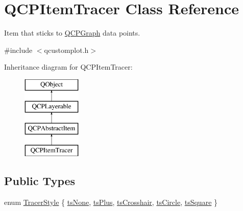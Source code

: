 \hypertarget{class_q_c_p_item_tracer}{}\section{Q\+C\+P\+Item\+Tracer Class Reference}
\label{class_q_c_p_item_tracer}


Item that sticks to \mbox{\hyperlink{class_q_c_p_graph}{Q\+C\+P\+Graph}} data points.  




{\ttfamily \#include $<$qcustomplot.\+h$>$}

Inheritance diagram for Q\+C\+P\+Item\+Tracer\+:\begin{figure}[H]
\begin{center}
\leavevmode
\includegraphics[height=4.000000cm]{d9/da3/class_q_c_p_item_tracer}
\end{center}
\end{figure}
\subsection*{Public Types}
\begin{DoxyCompactItemize}
\item 
enum \mbox{\hyperlink{class_q_c_p_item_tracer_a2f05ddb13978036f902ca3ab47076500}{Tracer\+Style}} \{ \newline
\mbox{\hyperlink{class_q_c_p_item_tracer_a2f05ddb13978036f902ca3ab47076500aac27462c79146225bfa8fba24d2ee8a4}{ts\+None}}, 
\mbox{\hyperlink{class_q_c_p_item_tracer_a2f05ddb13978036f902ca3ab47076500a3323fb04017146e4885e080a459472fa}{ts\+Plus}}, 
\mbox{\hyperlink{class_q_c_p_item_tracer_a2f05ddb13978036f902ca3ab47076500af562ec81ac3ba99e26ef8540cf1ec16f}{ts\+Crosshair}}, 
\mbox{\hyperlink{class_q_c_p_item_tracer_a2f05ddb13978036f902ca3ab47076500ae2252c28f4842880d71e9f94e69de94e}{ts\+Circle}}, 
\newline
\mbox{\hyperlink{class_q_c_p_item_tracer_a2f05ddb13978036f902ca3ab47076500a4ed5f01f2c5fd86d980366d79f481b9b}{ts\+Square}}
 \}
\end{DoxyCompactItemize}
